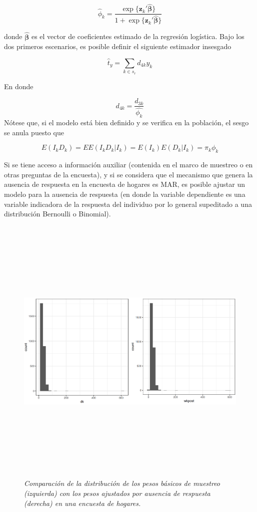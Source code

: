 \documentclass[
  10pt,
  spanish,
]{book}
\begin{document}
\[
\hat{\phi}_k = \frac{\exp\{\mathbf{z}_k'\hat{\boldsymbol{\beta}}\}}{1 + \exp\{\mathbf{z}_k'\hat{\boldsymbol{\beta}}\}}
\]

donde \(\hat{\mathbf{\beta}}\) es el vector de coeficientes estimado de la regresión logística. Bajo los dos primeros escenarios, es posible definir el siguiente estimador insesgado

\[
\hat{t}_y=\sum_{k\in s_r}d_{4k}y_k
\]

En donde

\[
d_{4k} = \frac{d_{3k}}{\hat{\phi_k}}
\]
Nótese que, si el modelo está bien definido y se verifica en la población, el sesgo se anula puesto que

\[
E(I_kD_k) 
= EE(I_kD_k|I_k) 
= E(I_k)E(D_k|I_k) = \pi_k \phi_k
\]

Si se tiene acceso a información auxiliar (contenida en el marco de muestreo o en otras preguntas de la encuesta), y si se considera que el mecanismo que genera la ausencia de respuesta en la encuesta de hogares es MAR, es posible ajustar un modelo para la ausencia de respuesta (en donde la variable dependiente es una variable indicadora de la respuesta del individuo por lo general supeditado a una distribución Bernoulli o Binomial).

\begin{figure}
\centering
\includegraphics[width=\textwidth,height=5.20833in]{Pics/18.png}
\caption{\emph{Comparación de la distribución de los pesos básicos de muestreo (izquierda) con los pesos ajustados por ausencia de respuesta (derecha) en una encuesta de hogares.}}
\end{figure}
\end{document}
